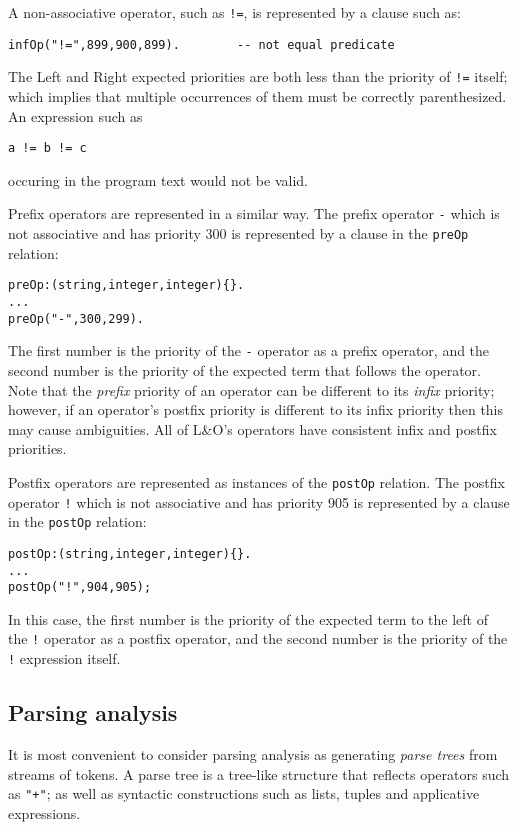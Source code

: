 A non-associative operator, such as \verb+!=+, is represented by a clause such as:
\begin{verbatim}
infOp("!=",899,900,899).		-- not equal predicate
\end{verbatim}
The Left and Right expected priorities are both less than the priority of \verb+!=+ itself; which implies that multiple occurrences of them must be correctly parenthesized. An expression such as
\begin{verbatim}
a != b != c
\end{verbatim}
occuring in the program text would not be valid.

Prefix operators are represented in a similar way. The prefix operator \verb+-+ which is not associative and has priority 300 is represented by a clause in the \verb+preOp+ relation:
\begin{verbatim}
preOp:(string,integer,integer){}.
...
preOp("-",300,299).
\end{verbatim}
The first number is the priority of the \verb+-+ operator as a prefix operator, and the second number is the priority of the expected term that follows the operator.  Note that the \emph{prefix} priority of an operator can be different to its \emph{infix} priority; however, if an operator's postfix priority is different to its infix priority then this may cause ambiguities. All of L&O's operators have consistent infix and postfix priorities.

Postfix operators are represented as instances of the \verb+postOp+ relation. The postfix operator \verb+!+ which is not associative and has priority 905 is represented by a clause in the \verb+postOp+ relation:
\begin{verbatim}
postOp:(string,integer,integer){}.
...
postOp("!",904,905);
\end{verbatim}
In this case, the first number is the priority of the expected term to the left of the \verb+!+ operator as a postfix operator, and the second number is the priority of the \verb+!+ expression itself.

\subsection{Parsing analysis}
It is most convenient to consider parsing analysis as generating \emph{parse trees} from streams of tokens.  A parse tree is a tree-like structure that reflects operators such as \verb!"+"!; as well as syntactic constructions such as lists, tuples and applicative expressions.

